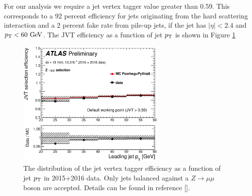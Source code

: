 

\indent For our analysis we require a jet vertex tagger value greater than 0.59.  This corresponds to a 92 percent efficiency for jets originating from the hard scattering interaction and a 2 percent fake rate from pile-up jets, if the jet has $|\eta| < 2.4$ and $\pt < 60 \gev$.  The JVT efficiency as a function of jet $\pt$ is shown in Figure \ref{fig:JVT_eff} \\

\begin{figure}[h!]
  \begin{center}
    \includegraphics[width=0.65\textwidth]{figures/JetCalib/JVT_eff.eps}\hspace{0.05\textwidth}
\end{center}
\caption[The distribution of the jet vertex tagger efficiency as a function of jet $\pt$ in 2015+2016 data.]{The distribution of the jet vertex tagger efficiency as a function of jet $\pt$ in 2015+2016 data. Only jets balanced against a $Z \rightarrow \mu\mu$ boson are accepted.  Details can be found in reference [\cite{JVT}]. }
\label{fig:JVT_eff} 
\end{figure}

